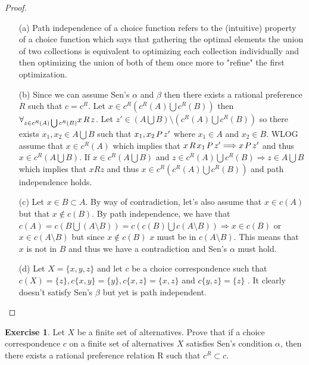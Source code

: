 \documentclass[11pt,oneside]{article}
\numberwithin{equation}{section}
\theoremstyle{definition}
\newtheorem{exercise}{Exercise}
\def\r{\hspace*{0.5mm} R \hspace*{0.5mm} }
\def\P{\hspace*{0.5mm} P \hspace*{0.5mm} }
\newcommand{\RIGHT}{\Longrightarrow}
\newcommand{\union}{\bigcup}
\begin{document}
\begin{proof}

\begin{itemize}

\item[(a)] Path independence of a choice function refers to the (intuitive) property of a choice function which says that gathering the optimal elements the union of two collections is equivalent to optimizing each collection individually and then optimizing the union of both of them once more to "refine" the first optimization.  


\item[(b)] Since we can assume Sen's $\alpha$ and $\beta$ then there exists a rational preference $R$ such that $c = c^R$. Let $x \in c^R(c^R(A) \union c^R(B))$ then ${\forall}_{z \in c^R(A) \union c^R(B)} x \r z$. Let $z' \in (A \union B) \setminus (c^R(A) \union c^R(B))$ so there exists $x_1, x_2 \in A \union B$ such that $x_1, x_2 \P z'$ where $x_1 \in A$ and $x_2 \in B$. WLOG assume that $x \in c^R(A)$ which implies that $x \r x_1 \P z' \RIGHT x \P z'$ and thus $x \in c^R(A \union B)$. If $x \in c^R(A \union B)$ and $z \in c^R(A) \union c^R(B) \RIGHT z \in A \union B$ which implies that $x R z$ and thus $x \in c^R(c^R(A) \union c^R(B))$ and path independence holds.  

\item[(c)] Let $x \in B \subset A$. By way of contradiction, let's also assume that $x \in c(A)$ but that $x \notin c(B)$. By path independence, we have that $c(A) = c(B \union (A \setminus B)) = c(c(B) \union c(A \setminus B)) \RIGHT x \in c(B)$ or $x \in c(A \setminus B)$ but since $x \notin c(B)$ $x$ must be in $c(A \setminus B)$. This means that $x$ is not in $B$ and thus we have a contradiction and Sen's $\alpha$ must hold. 

\item[(d)] Let $X = \{x,y,z\}$ and let $c$ be a choice correspondence such that $c(X) = \{z\}, c\{x,y\} = \{y\}, c\{x,z\} = \{x,z\}$ and $ c\{y,z\} = \{z\}$ . It clearly doesn't satisfy Sen's $\beta$ but yet is path independent. 

\end{itemize}


\end{proof}


\begin{exercise}
Let $X$ be a finite set of alternatives. Prove that if a choice correspondence $c$ on a finite set of alternatives $X$ satisfies Sen’s condition $\alpha$, then there exists a rational preference relation R such that $c^R \subset c$.


\end{exercise} 
\end{document}
